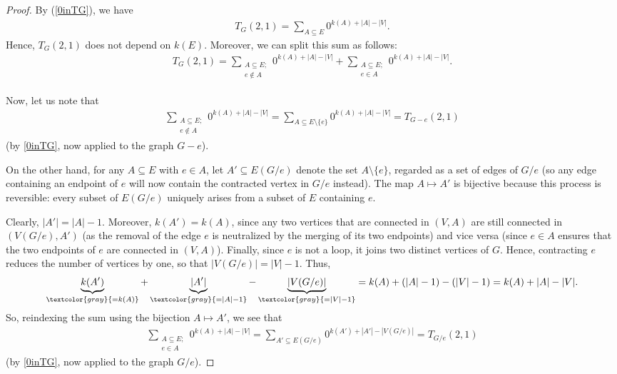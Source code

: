 \documentclass[12pt]{article}
\theoremstyle{definition}
\theoremstyle{remark}
\begin{document}
\begin{proof}
    By (\ref{0inTG}), we have \begin{align*}
        T_{G}(2,1) = \sum_{A \subseteq E}0^{k(A)+|A|-|V|}.
    \end{align*} Hence, $T_G(2,1)$ does not depend on $k(E)$. Moreover, we can split this sum as follows: \begin{align*}
        T_G(2,1) = \sum_{\substack{A \subseteq E; \\ e \notin A}}0^{k(A)+|A|-|V|} + \sum_{\substack{A \subseteq E; \\ e \in A}}0^{k(A)+|A|-|V|}.
    \end{align*}

    Now, let us note that \begin{align*}
        \sum_{\substack{A \subseteq E; \\ e \notin A}}0^{k(A)+|A|-|V|} = \sum_{A \subseteq E\setminus \{e\}}0^{k(A)+|A|-|V|} = T_{G-e}(2,1)
    \end{align*}
	(by \eqref{0inTG}, now applied to the graph $G-e$).

    On the other hand, for any $A \subseteq E$ with $e \in A$, let $A' \subseteq E(G/e)$ denote the set $A \setminus \{e\}$, regarded as a set of edges of $G/e$ (so any edge containing an endpoint of $e$ will now contain the contracted vertex in $G/e$ instead).
	The map $A \mapsto A'$ is bijective because this process is reversible: every subset of $E(G/e)$ uniquely arises from a subset of $E$ containing $e$.

    Clearly, $|A'| = |A|-1$. Moreover, $k(A') = k(A)$, since any two vertices that are connected in $(V, A)$ are still connected in $(V(G/e), A')$ (as the removal of the edge $e$ is neutralized by the merging of its two endpoints) and vice versa (since $e \in A$ ensures that the two endpoints of $e$ are connected in $(V, A)$).
	Finally, since $e$ is not a loop, it joins two distinct vertices of $G$. Hence, contracting $e$ reduces the number of vertices by one, so that $|V(G/e)|=|V|-1$. Thus, \begin{align*}
        \underbrace{k(A')}_{\textcolor{gray}{=k(A)}}+\underbrace{|A'|}_{\textcolor{gray}{=|A|-1}}-\underbrace{|V(G/e)|}_{\textcolor{gray}{=|V|-1}} = k(A)+(|A|-1)-(|V|-1) = k(A)+|A|-|V|.
    \end{align*} So, reindexing the sum using the bijection $A \mapsto A'$, we see that \begin{align*}
        \sum_{\substack{A \subseteq E; \\ e \in A}}0^{k(A)+|A|-|V|} = \sum_{A' \subseteq E(G/e)}0^{k(A')+|A'|-|V(G/e)|} = T_{G/e}(2,1)
    \end{align*}
	(by \eqref{0inTG}, now applied to the graph $G/e$).
    

\end{proof}
\end{document}
